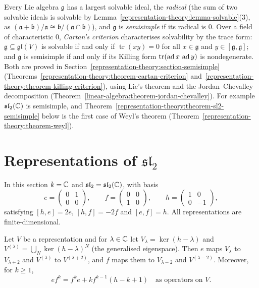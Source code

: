 \begin{remark}\label{representation-theory:remark-cartan-criterion}
Every Lie algebra $\mathfrak{g}$ has a largest solvable ideal, the \emph{radical} (the sum of two solvable ideals is solvable by
Lemma~\ref{representation-theory:lemma-solvable}(3), as $(\mathfrak{a} + \mathfrak{b})/\mathfrak{a} \cong \mathfrak{b}/(\mathfrak{a} \cap \mathfrak{b})$), and
$\mathfrak{g}$ is \emph{semisimple} if its radical is $0$. Over a field of characteristic $0$, \emph{Cartan's criterion} characterises solvability by the trace form:
$\mathfrak{g} \subseteq \mathfrak{gl}(V)$ is solvable if and only if $\operatorname{tr}(xy) = 0$ for all $x \in \mathfrak{g}$ and $y \in [\mathfrak{g}, \mathfrak{g}]$;
and $\mathfrak{g}$ is semisimple if and only if its Killing form $\operatorname{tr}(\operatorname{ad} x\,\operatorname{ad} y)$ is nondegenerate. Both are proved in Section~\ref{representation-theory:section-semisimple}
(Theorems~\ref{representation-theory:theorem-cartan-criterion} and~\ref{representation-theory:theorem-killing-criterion}), using Lie's theorem and the Jordan--Chevalley
decomposition (Theorem~\ref{linear-algebra:theorem-jordan-chevalley}). For example $\mathfrak{sl}_2(\mathbb{C})$ is semisimple, and
Theorem~\ref{representation-theory:theorem-sl2-semisimple} below is the first case of Weyl's theorem (Theorem~\ref{representation-theory:theorem-weyl}).
\end{remark}

\section{Representations of $\mathfrak{sl}_2$}\label{representation-theory:section-sl2}

In this section $k = \mathbb{C}$ and $\mathfrak{sl}_2 = \mathfrak{sl}_2(\mathbb{C})$, with basis
\[
e = \begin{pmatrix} 0 & 1 \\ 0 & 0 \end{pmatrix}, \qquad f = \begin{pmatrix} 0 & 0 \\ 1 & 0 \end{pmatrix}, \qquad
h = \begin{pmatrix} 1 & 0 \\ 0 & -1 \end{pmatrix},
\]
satisfying $[h, e] = 2e$, $[h, f] = -2f$ and $[e, f] = h$. All representations are finite-dimensional.

\begin{lemma}\label{representation-theory:lemma-sl2-weights}
Let $V$ be a representation and for $\lambda \in \mathbb{C}$ let $V_\lambda = \ker(h - \lambda)$ and
$V^{(\lambda)} = \bigcup_N \ker(h - \lambda)^N$ (the generalised eigenspace). Then $e$ maps $V_\lambda$ to $V_{\lambda + 2}$ and
$V^{(\lambda)}$ to $V^{(\lambda + 2)}$, and $f$ maps them to $V_{\lambda - 2}$ and $V^{(\lambda - 2)}$. Moreover, for $k \geq 1$,
\[
e f^k = f^k e + k f^{k-1}(h - k + 1) \quad \text{as operators on } V.
\]
\end{lemma}

